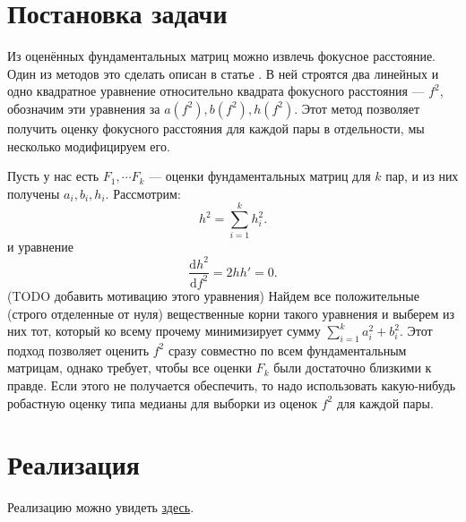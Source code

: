 \label{focal}
\section{Постановка задачи}
Из оценённых фундаментальных матриц можно извлечь фокусное расстояние. Один из методов это сделать описан в статье \cite{Sturm:2005:FLC:1090456.1649082}. В ней строятся два линейных и одно квадратное уравнение относительно квадрата фокусного расстояния --- $f^2$, обозначим эти уравнения за $a\left(f^2\right), b\left(f^2\right), h\left(f^2\right)$. Этот метод позволяет получить  оценку фокусного расстояния для каждой пары в отдельности, мы несколько модифицируем его. 

Пусть у нас есть $F_1, \cdots F_k$ --- оценки фундаментальных матриц для $k$ пар, и из них получены $a_i, b_i, h_i$. 
Рассмотрим:
\begin{equation}
	h^2 = \sum\limits_{i=1}^{k} h^2_i.
\end{equation} 
и уравнение
\begin{equation}
	\frac{\mathrm{d} h^2}{\mathrm{d}f^2} = 2hh' = 0.
\end{equation} 
(TODO добавить мотивацию этого уравнения) Найдем все положительные (строго отделенные от нуля) вещественные корни такого уравнения и выберем из них тот, который ко всему прочему минимизирует сумму $\sum\limits_{i=1}^{k} a_i^2 + b_i^2$. Этот подход позволяет оценить $f^2$ сразу совместно по всем фундаментальным матрицам, однако требует, чтобы все оценки $F_k$ были достаточно близкими к правде. Если этого не получается обеспечить, то надо использовать какую-нибудь робастную оценку типа медианы для выборки из оценок $f^2$ для каждой пары.
\section{Реализация}
Реализацию можно увидеть \href{https://github.com/QuantumMechanicus/camera_calibration_test/blob/dev/subroutines/focal_length_estimator/Focal_Estimator.cpp}{здесь}.
